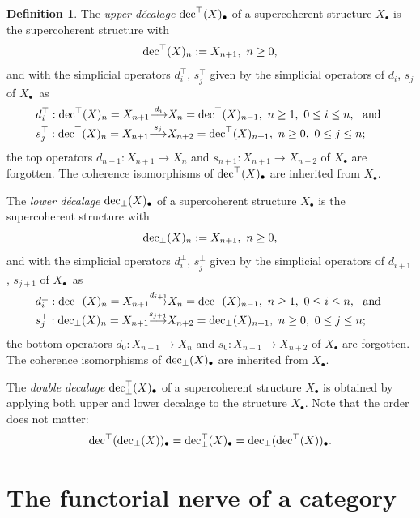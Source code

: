 \documentclass[12pt,leqno]{amsart}
\theoremstyle{definition}
\newtheorem{definition}[theorem]{Definition}
\def\udec{{\rm dec}^{\top}}
\def\ldec{{\rm dec}_{\bot}}
\def\uldec{{\rm dec}_{\bot}^{\top}}
\def\redukce#1{\vbox to .3em{\vss\hbox{#1}}}
\newcommand{\4}{\texttt{4}}
\begin{document}
\begin{definition}
\label{Dnes si jdu koupit ztraceny houbarsky nuz.}
The \textit{upper d\'ecalage}  $\udec(X)_\bullet$ of a 
supercoherent structure
$X_\bullet$ is the supercoherent structure with 
\[
\udec(X)_n := X_{n+1},\ n \geq
0,
\] 
 and with the simplicial operators $d^{\top}_i$, $s^{\top}_j$ 
given by the simplicial operators of
$d_i$, $s_j$ of $X_\bullet$~as 
\begin{align*}
&d^{\top}_i: \udec(X)_n = X_{n+1} \redukce{$\stackrel {d_i}\longrightarrow$} 
X_n = \udec(X)_{n-1}, \ n
\geq 1, \ 0 \leq i \leq n,  \ \hbox { and } 
\\
&s^{\top}_j: \udec(X)_n = X_{n+1} \redukce{$\stackrel {s_j}\longrightarrow$} 
X_{n+2}  =   \udec(X)_{n+1},  \ n
\geq 0, \ 0 \leq j \leq n;
\end{align*}
the top operators $d_{n+1} : X_{n+1} \to X_n$ and   
$s_{n+1} : X_{n+1} \to X_{n+2}$ of $X_\bullet$ are forgotten. The 
coherence isomorphisms
of $\udec(X)_\bullet$ are inherited from $X_\bullet$.

    The \textit{lower d\'ecalage}  $\ldec(X)_\bullet$ of a
supercoherent structure $X_\bullet$ is the supercoherent structure with 
\[
\ldec(X)_n := X_{n+1},\ n \geq
0,
\] 
and with the simplicial operators $d^{\bot}_i$, $s^{\bot}_j$ 
given by the simplicial operators of
$d_{i+1}$, $s_{j+1}$ of $X_\bullet$~as 
\begin{align*}
&d^{\bot}_i: \ldec(X)_n = X_{n+1} \redukce{$\stackrel {d_{i+1}}\longrightarrow$} 
X_n = \ldec(X)_{n-1}, \ n
\geq 1, \ 0 \leq i \leq n,  \ \hbox { and } 
\\
&s^{\bot}_j: \ldec(X)_n = X_{n+1} \redukce{$\stackrel {s_{j+1}}\longrightarrow$} 
X_{n+2}  =   \ldec(X)_{n+1},  \ n
\geq 0, \ 0 \leq j \leq n;
\end{align*}
the bottom operators $d_{0} : X_{n+1} \to X_n$ and   
$s_{0} : X_{n+1} \to X_{n+2}$ of $X_\bullet$ are forgotten. The 
coherence isomorphisms of $\ldec(X)_\bullet$ are inherited from $X_\bullet$.

The \textit{double decalage} $\uldec (X)_\bullet$ of a supercoherent structure $X_\bullet$ is obtained by applying both upper and lower decalage to the structure $X_\bullet$. Note that the order does not matter: 
\begin{equation*}
\label{decdec}
    \udec(\ldec (X))_\bullet=\uldec( X)_\bullet=\ldec(\udec (X))_\bullet.
\end{equation*}
\end{definition}

\section{The functorial nerve of a category}
\label{S Jarkou na vystavu do muzea literatury - to bude nuda!}
\end{document}

